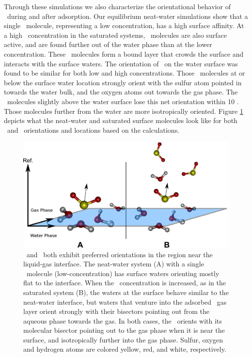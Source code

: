 \documentclass{article}
\begin{document}
Through these simulations we also characterize the orientational behavior of \suldiox~during and after adsorption. Our equilibrium neat-water simulations show that a single \suldiox~molecule, representing a low concentration, has a high surface affinity. At a high \suldiox~concentration in the saturated systems, \suldiox~molecules are also surface active, and are found further out of the water phase than at the lower concentration. These \suldiox~molecules form a bound layer that crowds the surface and interacts with the surface waters. The orientation of \suldiox~on the water surface was found to be similar for both low and high concentrations. Those \suldiox~molecules at or below the surface water location strongly orient with the sulfur atom pointed in towards the water bulk, and the oxygen atoms out towards the gas phase. The \suldiox~molecules slightly above the water surface lose this net orientation within 10 \angs. Those  molecules further from the water are more isotropically oriented. Figure \ref{fig:so2-surface-cartoon} depicts what the neat-water and saturated surface molecules look like for both \suldiox~and \wat~orientations and locations based on the calculations.


\begin{figure}[h!]
	\begin{center}
		\includegraphics[scale=1.0]{images/system-surface.png}
		\caption{\wat~and \suldiox~both exhibit preferred orientations in the region near the liquid-gas interface. The neat-water system (A) with a single \suldiox~molecule (low-concentration) has surface waters orienting mostly flat to the interface. When the \suldiox~concentration is increased, as in the saturated system (B), the waters at the surface behave similar to the neat-water interface, but waters that venture into the adsorbed \suldiox~gas layer orient strongly with their bisectors pointing out from the aqueous phase towards the gas. In both cases, the \suldiox~orients with its molecular bisector pointing out to the gas phase when it is near the surface, and isotropically further into the gas phase. Sulfur, oxygen and hydrogen atoms are colored yellow, red, and white, respectively.}
		\label{fig:so2-surface-cartoon}
	\end{center}
\end{figure}
\end{document}
